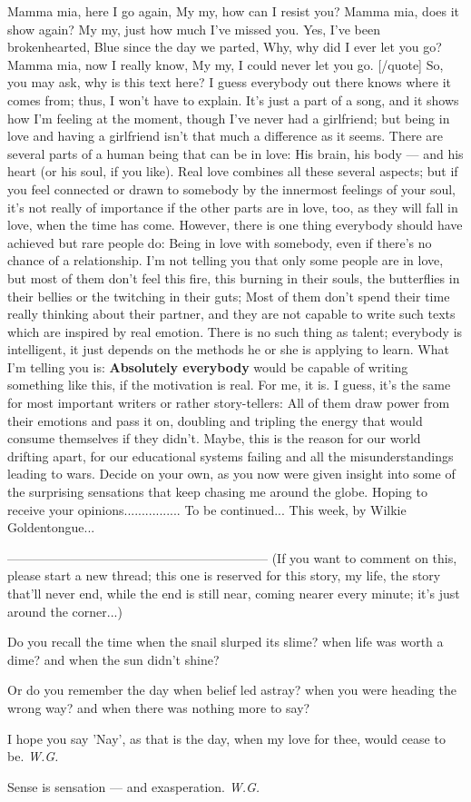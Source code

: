 Mamma mia, here I go again,
My my, how can I resist you? 
Mamma mia, does it show again?
My my, just how much I've missed you. 
Yes, I've been brokenhearted, 
Blue since the day we parted, 
Why, why did I ever let you go? 
Mamma mia, now I really know,
My my, I could never let you go. 
[/quote]
So, you may ask, why is this text here? I guess everybody out there knows where it comes from; thus, I won't have to explain. 
It's just a part of a song, and it shows how I'm feeling at the moment, though I've never had a girlfriend; but being in love and having a girlfriend isn't that much a difference as it seems. There are several parts of a human being that can be in love: His brain, his body --- and his heart (or his soul, if you like). 
Real love combines all these several aspects; but if you feel connected or drawn to somebody by the innermost feelings of your soul, it's not really of importance if the other parts are in love, too, as they will fall in love, when the time has come. 
However, there is one thing everybody should have achieved but rare people do: Being in love with somebody, even if there's no chance of a relationship. 
I'm not telling you that only some people are in love, but most of them don't feel this fire, this burning in their souls, the butterflies in their bellies or the twitching in their guts; Most of them don't spend their time really thinking about their partner, and they are not capable to write such texts which are inspired by real emotion. 
There is no such thing as talent; everybody is intelligent, it just depends on the methods he or she is applying to learn. 
What I'm telling you is: \textbf{Absolutely everybody} would be capable of writing something like this, if the motivation is real. 
For me, it is. 
I guess, it's the same for most important writers or rather story-tellers: All of them draw power from their emotions and pass it on, doubling and tripling the energy that would consume themselves if they didn't. 
Maybe, this is the reason for our world drifting apart, for our educational systems failing and all the misunderstandings leading to wars. 
Decide on your own, as you now were given insight into some of the surprising sensations that keep chasing me around the globe. 
Hoping to receive your opinions................
To be continued...
This week, by Wilkie Goldentongue...

--------------------------------------------------------------
(If you want to comment on this, please start a new thread; this one is reserved for this story, my life, the story that'll never end, while the end is still near, coming nearer every minute; it's just around the corner...)


Do you recall the time
when the snail slurped its slime?
when life was worth a dime?
and when the sun didn't shine?

Or do you remember the day
when belief led astray?
when you were heading the wrong way?
and when there was nothing more to say?

I hope you say 'Nay',
as that is the day,
when my love for thee,
would cease to be. 
\emph{W.G.}

Sense is sensation --- and exasperation. 
\emph{W.G.}
